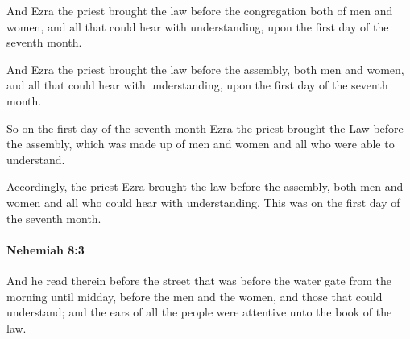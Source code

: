 			And Ezra the priest brought the law before the congregation both of men and women, and all that could hear with understanding, upon the first day of the seventh month.

			\begin{versebox}
					\item[BHS] 
					\item[LXX] 
					\item[ASV] And Ezra the priest brought the law before the assembly, both men and women, and all that could hear with understanding, upon the first day of the seventh month.
					\item[NIV] So on the first day of the seventh month Ezra the priest brought the Law before the assembly, which was made up of men and women and all who were able to understand.
					\item[NRSV] Accordingly, the priest Ezra brought the law before the assembly, both men and women and all who could hear with understanding. This was on the first day of the seventh month.
			\end{versebox}

		\paragraph{Nehemiah 8:3} %
			\label{NEHEMIAH-8-3}

			And he read therein before the street that was before the water gate from the morning until midday, before the men and the women, and those that could understand; and the ears of all the people were attentive unto the book of the law.

